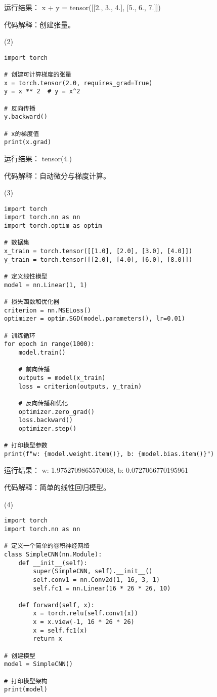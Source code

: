 \documentclass[a4paper, 12pt]{article}
\begin{document}
{\color{blue}
运行结果：
x + y = tensor([[2., 3., 4.],
        [5., 6., 7.]])
}

代码解释：创建张量。

(2)
\begin{verbatim}
import torch

# 创建可计算梯度的张量
x = torch.tensor(2.0, requires_grad=True)
y = x ** 2  # y = x^2

# 反向传播
y.backward()

# x的梯度值
print(x.grad)  

\end{verbatim}

{\color{blue}
运行结果：
tensor(4.)
}

代码解释：自动微分与梯度计算。

(3)
\begin{verbatim}
import torch
import torch.nn as nn
import torch.optim as optim

# 数据集
x_train = torch.tensor([[1.0], [2.0], [3.0], [4.0]])
y_train = torch.tensor([[2.0], [4.0], [6.0], [8.0]])

# 定义线性模型
model = nn.Linear(1, 1)

# 损失函数和优化器
criterion = nn.MSELoss()
optimizer = optim.SGD(model.parameters(), lr=0.01)

# 训练循环
for epoch in range(1000):
    model.train()
    
    # 前向传播
    outputs = model(x_train)
    loss = criterion(outputs, y_train)
    
    # 反向传播和优化
    optimizer.zero_grad()
    loss.backward()
    optimizer.step()

# 打印模型参数
print(f"w: {model.weight.item()}, b: {model.bias.item()}")
\end{verbatim}

{\color{blue}
运行结果：
w: 1.9752709865570068, b: 0.0727066770195961
}

代码解释：简单的线性回归模型。

(4)
\begin{verbatim}
import torch
import torch.nn as nn

# 定义一个简单的卷积神经网络
class SimpleCNN(nn.Module):
    def __init__(self):
        super(SimpleCNN, self).__init__()
        self.conv1 = nn.Conv2d(1, 16, 3, 1)
        self.fc1 = nn.Linear(16 * 26 * 26, 10)

    def forward(self, x):
        x = torch.relu(self.conv1(x))
        x = x.view(-1, 16 * 26 * 26)
        x = self.fc1(x)
        return x

# 创建模型
model = SimpleCNN()

# 打印模型架构
print(model)
\end{verbatim}
\end{document}
